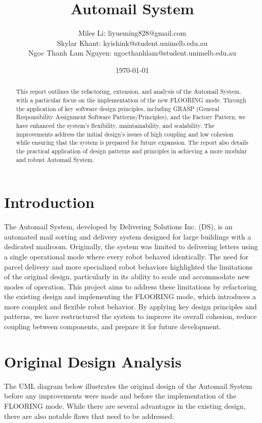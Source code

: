 \documentclass[12pt]{article}
\title{Automail System}
\author{Miles Li: liyueming828@gmail.com\\ Skylar Khant: kyishink@student.unimelb.edu.au\\Ngoc Thanh Lam Nguyen: ngocthanhlam@student.unimelb.edu.au}
\date{\today}
\begin{document}
\onehalfspacing

\maketitle

\newpage

\begin{abstract}
This report outlines the refactoring, extension, and analysis of the Automail System, with a particular focus on the implementation of the new FLOORING mode. Through the application of key software design principles, including GRASP (General Responsibility Assignment Software Patterns/Principles), and the Factory Pattern, we have enhanced the system's flexibility, maintainability, and scalability. The improvements address the initial design's issues of high coupling and low cohesion while ensuring that the system is prepared for future expansion. The report also details the practical application of design patterns and principles in achieving a more modular and robust Automail System.
\end{abstract}

\tableofcontents

\newpage

\section{Introduction}
\setlength{\parindent}{2em} The Automail System, developed by Delivering Solutions Inc. (DS), is an automated mail sorting and delivery system designed for large buildings with a dedicated mailroom. Originally, the system was limited to delivering letters using a single operational mode where every robot behaved identically. The need for parcel delivery and more specialized robot behaviors highlighted the limitations of the original design, particularly in its ability to scale and accommodate new modes of operation. This project aims to address these limitations by refactoring the existing design and implementing the FLOORING mode, which introduces a more complex and flexible robot behavior. By applying key design principles and patterns, we have restructured the system to improve its overall cohesion, reduce coupling between components, and prepare it for future development.


\section{Original Design Analysis}
\setlength{\parindent}{2em} The UML diagram below illustrates the original design of the Automail System before any improvements were made and before the implementation of the FLOORING mode. While there are several advantages in the existing design, there are also notable flaws that need to be addressed:
\end{document}
